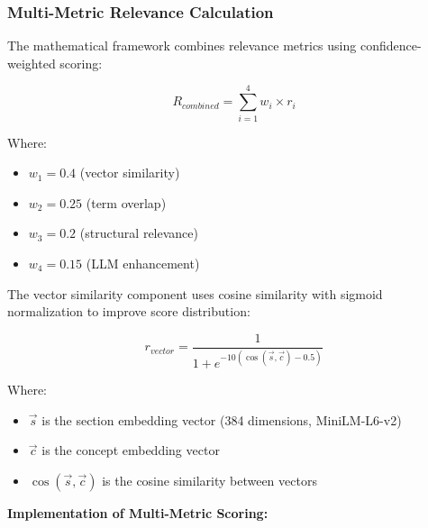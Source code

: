 \subsubsection{Multi-Metric Relevance Calculation}

The mathematical framework combines relevance metrics using confidence-weighted scoring:

\begin{equation}
R_{combined} = \sum_{i=1}^{4} w_i \times r_i
\end{equation}

Where:
\begin{itemize}
\item $w_1 = 0.4$ (vector similarity)
\item $w_2 = 0.25$ (term overlap)
\item $w_3 = 0.2$ (structural relevance)
\item $w_4 = 0.15$ (LLM enhancement)
\end{itemize}

The vector similarity component uses cosine similarity with sigmoid normalization to improve score distribution:

\begin{equation}
r_{vector} = \frac{1}{1 + e^{-10(\cos(\vec{s},\vec{c}) - 0.5)}}
\end{equation}

Where:
\begin{itemize}
\item $\vec{s}$ is the section embedding vector (384 dimensions, MiniLM-L6-v2)
\item $\vec{c}$ is the concept embedding vector
\item $\cos(\vec{s},\vec{c})$ is the cosine similarity between vectors
\end{itemize}

\textbf{Implementation of Multi-Metric Scoring:}

